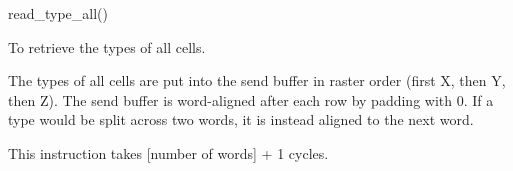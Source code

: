 

\format
read\_type\_all()

\purpose

To retrieve the types of all cells.

\description

The types of all cells are put into the send buffer in raster order (first X, then Y, then Z).
The send buffer is word-aligned after each row by padding with 0.
If a type would be split across two words, it is instead aligned to the next word.

\notes

This instruction takes [number of words] + 1 cycles.

